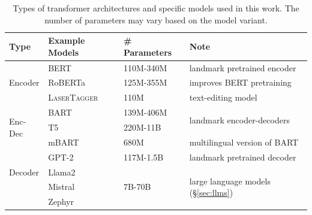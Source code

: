 {\begin{table}[t]
    \footnotesize
    \centering
    \begin{tabular}{lllp{4.5cm}}
        \toprule
        \textbf{Type}            & \textbf{Example Models}                              & \textbf{\# Parameters}  & \textbf{Note}                                            \\
        \midrule
        \multirow{3}{*}{Encoder} & BERT \cite{devlinBERTPretrainingDeep2019}            & 110M-340M               & landmark pretrained encoder                              \\
                                 & RoBERTa \cite{liuRoBERTaRobustlyOptimized2019}       & 125M-355M               & improves BERT pretraining                                \\
                                 & \textsc{LaserTagger} \cite{malmi2019lasertagger}     & 110M                    & text-editing model                                       \\
        \midrule
        \multirow{3}{*}{Enc-Dec} & BART \cite{lewisBARTDenoisingSequencetoSequence2019} & 139M-406M               & \multirow{2}{*}{landmark encoder-decoders}               \\
                                 & T5 \cite{raffelExploringLimitsTransfer2019}          & 220M-11B                &                                                          \\
                                 & mBART \cite{liuMultilingualDenoisingPretraining2020} & 680M                    & multilingual version of BART                             \\
        \midrule
        \multirow{3}{*}{Decoder} & GPT-2 \cite{radfordLanguageModelsAre2019}            & 117M-1.5B               & landmark pretrained decoder                              \\
                                 & Llama2 \cite{touvronLlamaOpenFoundation2023}         & \multirow{3}{*}{7B-70B} & \multirow{3}{*}{large language models (§\ref{sec:llms})} \\
                                 & Mistral \cite{jiangMistral7B2023}                    &                         &                                                          \\
                                 & Zephyr \cite{tunstallZephyrDirectDistillation2023}   &                         &                                                          \\
        \bottomrule
    \end{tabular}
    \caption{Types of transformer architectures and specific models used in this work. The number of parameters may vary based on the model variant.}
    \label{tab:pretrained_models}
\end{table}


}
